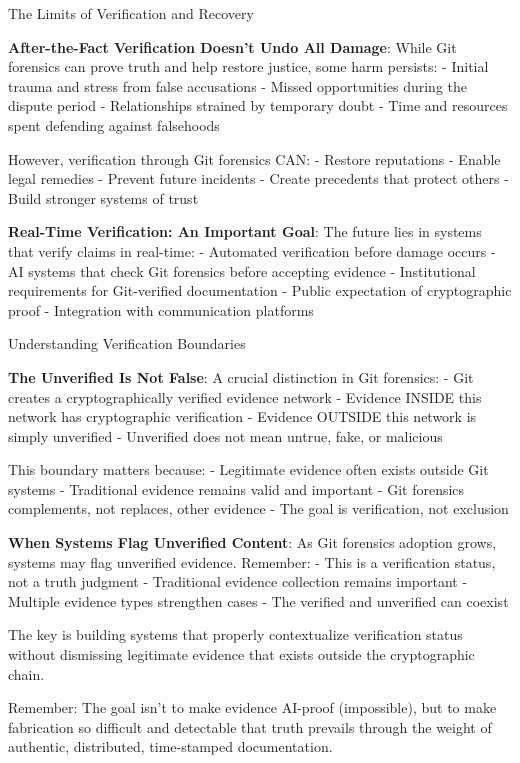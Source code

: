 The Limits of Verification and Recovery

\textbf{After-the-Fact Verification Doesn't Undo All Damage}: While Git
forensics can prove truth and help restore justice, some harm persists:
- Initial trauma and stress from false accusations - Missed
opportunities during the dispute period - Relationships strained by
temporary doubt - Time and resources spent defending against falsehoods

However, verification through Git forensics CAN: - Restore reputations -
Enable legal remedies - Prevent future incidents - Create precedents
that protect others - Build stronger systems of trust

\textbf{Real-Time Verification: An Important Goal}: The future lies in
systems that verify claims in real-time: - Automated verification before
damage occurs - AI systems that check Git forensics before accepting
evidence - Institutional requirements for Git-verified documentation -
Public expectation of cryptographic proof - Integration with
communication platforms

Understanding Verification Boundaries

\textbf{The Unverified Is Not False}: A crucial distinction in Git
forensics: - Git creates a cryptographically verified evidence network -
Evidence INSIDE this network has cryptographic verification - Evidence
OUTSIDE this network is simply unverified - Unverified does not mean
untrue, fake, or malicious

This boundary matters because: - Legitimate evidence often exists
outside Git systems - Traditional evidence remains valid and important -
Git forensics complements, not replaces, other evidence - The goal is
verification, not exclusion

\textbf{When Systems Flag Unverified Content}: As Git forensics adoption
grows, systems may flag unverified evidence. Remember: - This is a
verification status, not a truth judgment - Traditional evidence
collection remains important - Multiple evidence types strengthen cases
- The verified and unverified can coexist

The key is building systems that properly contextualize verification
status without dismissing legitimate evidence that exists outside the
cryptographic chain.

Remember: The goal isn't to make evidence AI-proof (impossible), but to
make fabrication so difficult and detectable that truth prevails through
the weight of authentic, distributed, time-stamped documentation.

